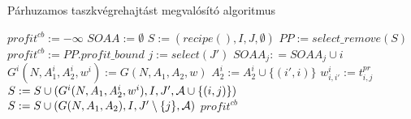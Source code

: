 \begin{algorithm}[H]
\caption{Párhuzamos taszkvégrehajtást megvalósító algoritmus}
\label{parhuzamos}
\begin{algorithmic}[1]
	\State $profit^{cb}:= -\infty$
	\State $SOAA:= \emptyset$
	\State $S:= {(recipe(),I,J,\emptyset)}$
		\State $PP:= select\_remove(S)$
					\State $profit^{cb}:=PP.profit\_bound$
				\Else
					\State $j:=select(J')$
						\State $SOAA_j: = SOAA_j\cup i$
						\State $G^i(N,A_1^i,A_2^i,w^i):= G(N,A_1,A_2,w)$
							\State $A_2^i:= A_2^i \cup \{(i',i)\}$				
						\EndFor
							\State $w_{i,i'}^i:= t_{i,j}^{pr}$
						\EndFor
						\State $S:= S \cup (G^i(N,A_1,A_2^i,w^i),I,J',{\cal A} \cup \{(i,j)\})$
					\EndFor
						\State $S:= S \cup (G(N,A_1,A_2),I,J'\setminus\{j\},{\cal A})$
					\EndIf					
				\EndIf
			\EndIf
		\EndIf
	\EndWhile
	\State \Return $profit^{cb}$
\EndProcedure
\end{algorithmic}
\end{algorithm}